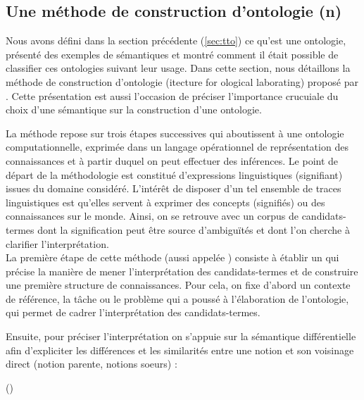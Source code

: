 \subsection{Une méthode de construction d'ontologie (n)}\label{sec:construction}
Nous avons défini dans la section précédente (\ref{sec:tto}) ce qu'est une ontologie,  présenté des exemples de sémantiques et montré comment il était possible de classifier ces ontologies suivant leur usage. 
Dans cette section, nous détaillons la méthode de construction d'ontologie  (itecture for ological laborating) proposé par \cite{Bachimont2000a}.
Cette présentation est aussi l'occasion de préciser l'importance crucuiale du choix d'une sémantique sur la construction d'une ontologie.

La méthode repose sur trois étapes successives qui aboutissent à une ontologie computationnelle, exprimée dans un langage opérationnel de représentation des connaissances et à partir duquel on peut effectuer des inférences. 
Le point de départ de la méthodologie est constitué d'expressions linguistiques (signifiant) issues du domaine considéré.
L'intérêt de disposer d'un tel ensemble de traces linguistiques est qu'elles servent à exprimer des concepts (signifiés) ou des connaissances sur le monde. 
Ainsi, on se retrouve avec un corpus de candidats-termes dont la signification peut être source d'ambiguïtés et dont l'on cherche à clarifier l'interprétation.\\
\g{[1.]} La première étape de cette méthode (aussi appelée ) consiste à établir un   qui précise la manière de mener l'interprétation des candidats-termes et de construire une première structure de connaissances. 
Pour cela, on fixe d'abord un contexte de référence, la tâche ou le problème qui a poussé à l'élaboration de l'ontologie, qui permet de cadrer l'interprétation des candidats-termes.

Ensuite, pour préciser l'interprétation on s'appuie sur la sémantique différentielle afin d'expliciter les différences et les similarités entre une notion et son voisinage direct (notion parente, notions soeurs) : 

	 (\cite[p.139]{bachimont:icc})

